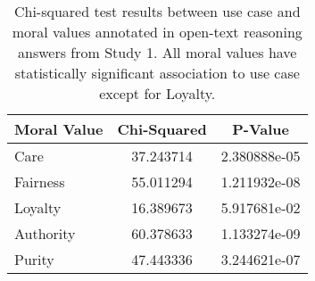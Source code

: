 \begin{table}[h]
\centering
\small
\begin{tabular}{lcc}
\toprule
\textbf{Moral Value} & \textbf{Chi-Squared} & \textbf{P-Value} \\ \hline
Care                 & 37.243714            & 2.380888e-05     \\
Fairness             & 55.011294            & 1.211932e-08     \\
Loyalty              & 16.389673            & 5.917681e-02     \\
Authority            & 60.378633            & 1.133274e-09     \\
Purity               & 47.443336            & 3.244621e-07     \\ 
\bottomrule
\end{tabular}
\caption{Chi-squared test results between use case and moral values annotated in open-text reasoning answers from Study 1. All moral values have statistically significant association to use case except for Loyalty.}
\label{tab:chi_squared_results}
\end{table}
